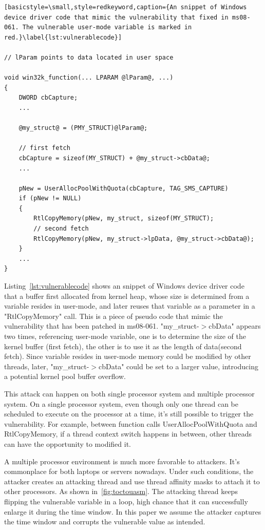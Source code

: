 \begin{lstlisting}[basicstyle=\small,style=redkeyword,caption={An snippet of Windows device driver code that mimic the vulnerability that fixed in ms08-061. The vulnerable user-mode variable is marked in red.}\label{lst:vulnerablecode}]

// lParam points to data located in user space

void win32k_function(... LPARAM @lParam@, ...) 
{
    DWORD cbCapture;
    ...

    @my_struct@ = (PMY_STRUCT)@lParam@;

    // first fetch
    cbCapture = sizeof(MY_STRUCT) + @my_struct->cbData@;  
    ...

    pNew = UserAllocPoolWithQuota(cbCapture, TAG_SMS_CAPTURE)
    if (pNew != NULL) 
    {
        RtlCopyMemory(pNew, my_struct, sizeof(MY_STRUCT);
        // second fetch
        RtlCopyMemory(pNew, my_struct->lpData, @my_struct->cbData@);   
    }
    ...
}

\end{lstlisting}

Listing~\ref{lst:vulnerablecode} shows an snippet of Windows device driver code~\cite{jurczyk2013identifying} that a buffer first allocated from kernel heap, whose size is determined from a variable resides in user-mode, and later reuses that variable as a parameter in a "RtlCopyMemory" call. This is a piece of pseudo code that mimic the vulnerability that has been patched in ms08-061. "my\_struct-$>$cbData" appears two times, referencing user-mode variable, one is to determine the size of the kernel buffer (first fetch), the other is to use it as the length of data(second fetch). Since variable resides in user-mode memory could be modified by other threads, later, "my\_struct-$>$cbData" could be set to a larger value, introducing a potential kernel pool buffer overflow.

This attack can happen on both single processor system and multiple processor system. On a single processor system, even though only one thread can be scheduled to execute on the processor at a time, it's still possible to trigger the vulnerability. For example, between function calls UserAllocPoolWithQuota and RtlCopyMemory, if a thread context switch happens in between, other threads can have the opportunity to modified it.

A multiple processor environment is much more favorable to attackers. It's commonplace for both laptops or servers nowadays. Under such conditions, the attacker creates an attacking thread and use thread affinity masks to attach it to other processors. As shown in~\autoref{fig:toctouasm}. The attacking thread keeps flipping the vulnerable variable in a loop, high chance that it can successfully enlarge it during the time window. In this paper we assume the attacker captures the time window and corrupts the vulnerable value as intended. 

